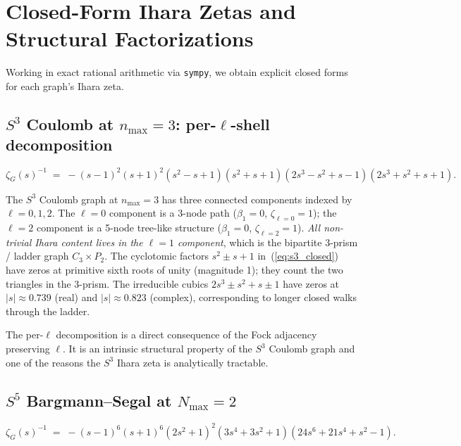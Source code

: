 \documentclass[11pt]{article}
\begin{document}
\section{Closed-Form Ihara Zetas and Structural Factorizations}
\label{sec:closed_forms}

Working in exact rational arithmetic via \texttt{sympy}, we obtain
explicit closed forms for each graph's Ihara zeta.

\subsection{$S^3$ Coulomb at $n_{\max}=3$: per-$\ell$-shell
decomposition}

\begin{equation}
\zeta_G(s)^{-1} \;=\; -(s-1)^2 (s+1)^2 (s^2 - s + 1)(s^2 + s + 1)
    (2s^3 - s^2 + s - 1)(2s^3 + s^2 + s + 1).
\label{eq:s3_closed}
\end{equation}

The $S^3$ Coulomb graph at $n_{\max}=3$ has three connected components
indexed by $\ell=0,1,2$.  The $\ell=0$ component is a 3-node path
($\beta_1=0$, $\zeta_{\ell=0}=1$); the $\ell=2$ component is a 5-node
tree-like structure ($\beta_1=0$, $\zeta_{\ell=2}=1$).  \emph{All
non-trivial Ihara content lives in the $\ell=1$ component}, which is
the bipartite 3-prism / ladder graph $C_3\times P_2$.  The cyclotomic
factors $s^2 \pm s + 1$ in~(\ref{eq:s3_closed}) have zeros at primitive
sixth roots of unity (magnitude 1); they count the two triangles in
the 3-prism.  The irreducible cubics $2s^3 \pm s^2 + s \pm 1$ have
zeros at $|s|\approx 0.739$ (real) and $|s|\approx 0.823$ (complex),
corresponding to longer closed walks through the ladder.

The per-$\ell$ decomposition is a direct consequence of the Fock
adjacency preserving $\ell$.  It is an intrinsic structural property
of the $S^3$ Coulomb graph and one of the reasons the $S^3$ Ihara zeta
is analytically tractable.

\subsection{$S^5$ Bargmann--Segal at $N_{\max}=2$}

\begin{equation}
\zeta_G(s)^{-1} \;=\; -(s-1)^6 (s+1)^6 (2s^2 + 1)^2 (3s^4 + 3s^2 + 1)
    (24s^6 + 21s^4 + s^2 - 1).
\label{eq:s5_nmax2_closed}
\end{equation}
\end{document}
